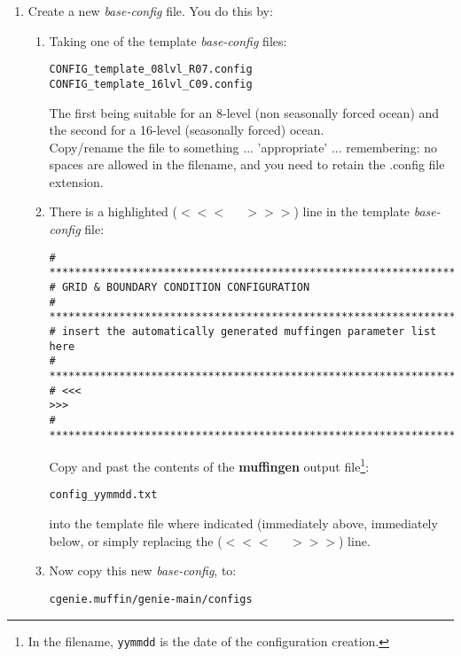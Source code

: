 \documentclass[11pt,fleqn]{book} %
\begin{document}
\begin{enumerate}
\vspace{1mm}
\item Create a new \textit{base-config} file. You do this by:
\begin{enumerate}
\vspace{1mm}
\item Taking one of the template \textit{base-config} files:
\vspace{-2pt}\begin{verbatim}
CONFIG_template_08lvl_R07.config
CONFIG_template_16lvl_C09.config
\end{verbatim}\vspace{-2pt}
The first being suitable for an 8-level (non seasonally forced ocean) and the second for a 16-level (seasonally forced) ocean.
\\Copy/rename the file to something ... 'appropriate' ... remembering: no spaces are allowed in the filename, and you need to retain the \textsf{.config} file extension.
\vspace{1mm}
\item There is a highlighted (\(<<<\;\;\;\;\;>>>\)) line in the template \textit{base-config} file:
\footnotesize\vspace{-2pt}\begin{verbatim}
# *******************************************************************
# GRID & BOUNDARY CONDITION CONFIGURATION
# *******************************************************************
# insert the automatically generated muffingen parameter list here
# *******************************************************************
# <<<                                                             >>>
# *******************************************************************
\end{verbatim}\vspace{-2pt}\normalsize
Copy and past the contents of the \textbf{muffingen} output file\footnote{In the filename, \texttt{yymmdd} is the date of the configuration creation.}:
\vspace{-2pt}\begin{verbatim}
config_yymmdd.txt
\end{verbatim}\vspace{-2pt}
into the template file where indicated (immediately above, immediately below, or simply replacing the (\(<<<\;\;\;\;\;>>>\)) line.
\vspace{1mm}
\item Now copy this new \textit{base-config}, to:
\vspace{-2pt}\begin{verbatim}
cgenie.muffin/genie-main/configs
\end{verbatim}\vspace{-2pt}
\end{enumerate}


\end{enumerate}
\end{document}
